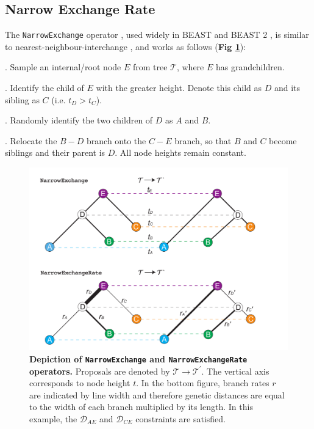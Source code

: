 \documentclass[10pt,letterpaper]{article}
\begin{document}
\clearpage
\subsection*{Narrow Exchange Rate} \label{sect:NER}

The \texttt{NarrowExchange} operator \cite{drummond2002estimating}, used widely in BEAST \cite{drummond2012bayesian,suchard2018bayesian} and BEAST 2 \cite{bouckaert2019beast}, is similar to nearest-neighbour-interchange \cite{semple2003phylogenetics}, and works as follows (\textbf{Fig \ref{fig:narrowexchange}}):

. Sample an internal/root node $E$ from tree $\mathcal{T}$, where $E$ has grandchildren.

. Identify the child of $E$ with the greater height. Denote this child as $D$ and its sibling as $C$ (i.e. $t_D > t_C$).

. Randomly identify the two children of $D$ as $A$ and $B$.

. Relocate the $B-D$ branch onto the $C-E$ branch, so that $B$ and $C$ become siblings and their parent is $D$. All node heights remain constant.


\begin{figure}[!h]
\includegraphics[width=\textwidth]{Figures/NarrowExchange.pdf}
\caption{\textbf{Depiction of \texttt{NarrowExchange} and \texttt{NarrowExchangeRate} operators.} Proposals are denoted by $\mathcal{T} \rightarrow \mathcal{T}^\prime$. The vertical axis corresponds to node height $t$. In the bottom figure, branch rates $r$ are indicated by line width and therefore genetic distances are equal to the width of each branch multiplied by its length. 
In this example, the $\mathcal{D}_{AE}$ and $\mathcal{D}_{CE}$ constraints are satisfied.
}
\label{fig:narrowexchange}
\end{figure}
\end{document}
